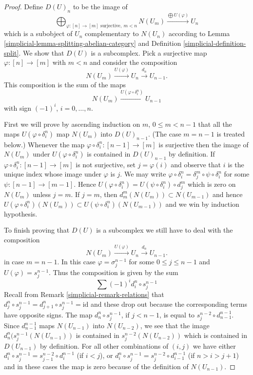 \begin{proof}

Define $D(U)_n$ to be the image of
$$
\bigoplus\nolimits_{\varphi : [n] \to [m]\text{ surjective}, \ m < n} N(U_m)
\xrightarrow{\bigoplus U(\varphi)}
U_n
$$
which is a subobject of $U_n$ complementary to
$N(U_n)$ according to Lemma \ref{simplicial-lemma-splitting-abelian-category} and
Definition \ref{simplicial-definition-split}. We show that
$D(U)$ is a subcomplex. Pick a surjective
map $\varphi : [n] \to [m]$ with $m < n$ and consider
the composition
$$
N(U_m) \xrightarrow{U(\varphi)} U_n \xrightarrow{d_n} U_{n - 1}.
$$
This composition is the sum of the maps
$$
N(U_m) \xrightarrow{U(\varphi \circ \delta^n_i)} U_{n - 1}
$$
with sign $(-1)^i$, $i = 0, \ldots, n$.

\medskip\noindent
First we will prove by ascending induction on $m$,
$0 \leq m < n - 1$ that all the maps $U(\varphi \circ \delta^n_i)$
map $N(U_m)$ into $D(U)_{n - 1}$. (The case $m = n - 1$ is treated below.)
Whenever the map $\varphi \circ \delta^n_i : [n - 1] \to [m]$
is surjective then the image of $N(U_m)$ under $U(\varphi \circ \delta^n_i)$
is contained in $D(U)_{n - 1}$ by definition.
If $\varphi \circ \delta^n_i : [n - 1] \to [m]$ is not surjective,
set $j = \varphi(i)$ and observe that $i$ is the unique
index whose image under $\varphi$ is $j$. We may write
$\varphi \circ \delta^n_i = \delta^m_j \circ \psi \circ \delta^n_i$
for some $\psi : [n - 1] \to [m - 1]$. Hence
$U(\varphi \circ \delta^n_i) = U(\psi \circ \delta^n_i) \circ d^m_j$ which
is zero on $N(U_m)$ unless $j = m$. If $j = m$, then
$d^m_m(N(U_m)) \subset N(U_{m - 1})$ and hence
$U(\varphi \circ \delta^n_i)(N(U_m)) \subset
U(\psi \circ \delta^n_i)(N(U_{m - 1}))$ and we win
by induction hypothesis.

\medskip\noindent
To finish proving that $D(U)$ is a subcomplex
we still have to deal with the composition
$$
N(U_m) \xrightarrow{U(\varphi)} U_n \xrightarrow{d_n} U_{n - 1}.
$$
in case $m =  n - 1$. In this case $\varphi = \sigma^{n - 1}_j$
for some $0 \leq j \leq n - 1$ and $U(\varphi) = s^{n - 1}_j$.
Thus the composition is given by the sum
$$
\sum (-1)^i d^n_i \circ s^{n - 1}_j
$$
Recall from Remark \ref{simplicial-remark-relations} that
$d^n_j \circ s^{n - 1}_j = d^n_{j + 1} \circ s^{n - 1}_j = \text{id}$
and these drop out because the corresponding terms have opposite signs.
The map $d^n_n \circ s^{n - 1}_j$, if $j < n - 1$, is equal to
$s^{n - 2}_j \circ d^{n - 1}_{n - 1}$. Since
$d^{n - 1}_{n - 1}$ maps $N(U_{n - 1})$ into $N(U_{n - 2})$,
we see that the image $d^n_n ( s^{n - 1}_j (N(U_{n - 1}))$
is contained in $s^{n - 2}_j(N(U_{n - 2}))$ which
is contained in $D(U_{n - 1})$ by definition. For all
other combinations of $(i, j)$ we have
either $d^n_i \circ s^{n - 1}_j = s^{n - 2}_{j - 1} \circ d^{n - 1}_i$
(if $i < j$), or
$d^n_i \circ s^{n - 1}_j = s^{n - 2}_j \circ d^{n - 1}_{i - 1}$
(if $n > i > j + 1$) and in these cases the map is zero because
of the definition of $N(U_{n - 1})$.
\end{proof}

